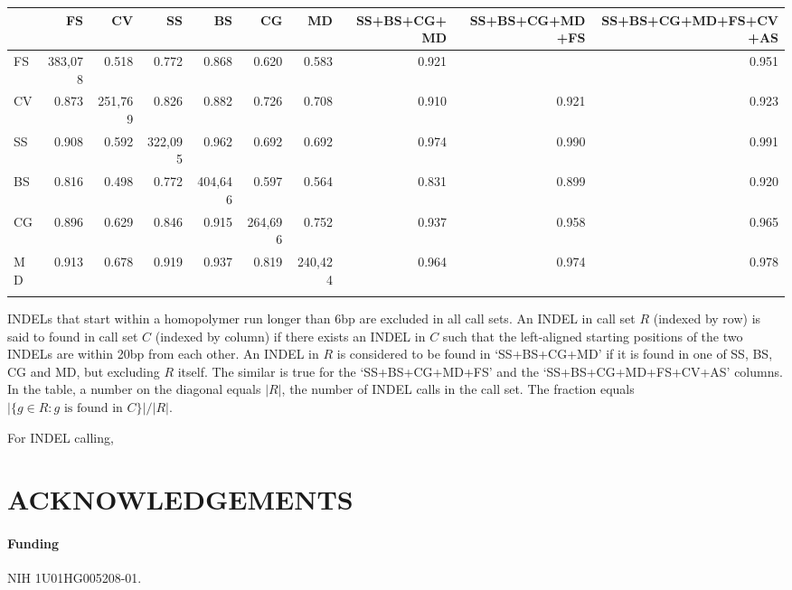 \documentclass{bioinfo}
\begin{document}
\begin{table*}[!htb]
{\begin{tabular*}{\textwidth}{@{\extracolsep{\fill}}lrrrrrrrrr}
\toprule
&FS&CV&SS&BS&CG&MD&SS+BS+CG+MD&SS+BS+CG+MD+FS&SS+BS+CG+MD+FS+CV+AS\\
\midrule
FS&383,078& 0.518 & 0.772 & 0.868 & 0.620 & 0.583 & 0.921 &       & 0.951\\
CV& 0.873 &251,769& 0.826 & 0.882 & 0.726 & 0.708 & 0.910 & 0.921 & 0.923\\
SS& 0.908 & 0.592 &322,095& 0.962 & 0.692 & 0.692 & 0.974 & 0.990 & 0.991\\
BS& 0.816 & 0.498 & 0.772 &404,646& 0.597 & 0.564 & 0.831 & 0.899 & 0.920\\
CG& 0.896 & 0.629 & 0.846 & 0.915 &264,696& 0.752 & 0.937 & 0.958 & 0.965\\
MD& 0.913 & 0.678 & 0.919 & 0.937 & 0.819 &240,424& 0.964 & 0.974 & 0.978\\
\botrule
\end{tabular*}}
{INDELs that start within a homopolymer run longer than 6bp are excluded in
all call sets. An INDEL in call set $R$ (indexed by row) is said to
found in call set $C$ (indexed by column) if there exists an INDEL in $C$
such that the left-aligned starting positions of the two INDELs are within 20bp
from each other.  An INDEL in $R$ is considered to be found in
`\mbox{SS+BS+CG+MD}' if it is found in one of SS, BS, CG and MD, but excluding $R$
itself. The similar is true for the `\mbox{SS+BS+CG+MD+FS}' and the
`\mbox{SS+BS+CG+MD+FS+CV+AS}' columns. In the table, a number on the diagonal equals $|R|$,
the number of INDEL calls in the call set. The fraction equals $|\{g\in R:g
\mbox{ is found in } C\}|/|R|$.}
\end{table*}

For INDEL calling, 

\section*{ACKNOWLEDGEMENTS}

\paragraph{Funding\textcolon} NIH 1U01HG005208-01.

\end{document}

